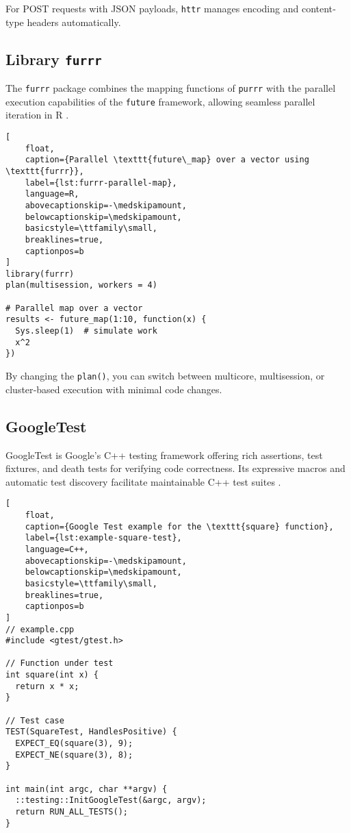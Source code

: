 For POST requests with JSON payloads, \texttt{httr} manages encoding and content‐type headers automatically.

\subsection{Library \texttt{furrr}}

The \texttt{furrr} package combines the mapping functions of \texttt{purrr} with the parallel execution capabilities of the \texttt{future} framework, allowing seamless parallel iteration in R \cite{Vaughan2020furrr}.

\begin{lstlisting}[
    float,
    caption={Parallel \texttt{future\_map} over a vector using \texttt{furrr}},
    label={lst:furrr-parallel-map},
    language=R,
    abovecaptionskip=-\medskipamount,
    belowcaptionskip=\medskipamount,
    basicstyle=\ttfamily\small,
    breaklines=true,
    captionpos=b
]
library(furrr)
plan(multisession, workers = 4)

# Parallel map over a vector
results <- future_map(1:10, function(x) {
  Sys.sleep(1)  # simulate work
  x^2
})
\end{lstlisting}


By changing the \texttt{plan()}, you can switch between multicore, multisession, or cluster‐based execution with minimal code changes.

\subsection{GoogleTest}

GoogleTest is Google’s C++ testing framework offering rich assertions, test fixtures, and death tests for verifying code correctness. Its expressive macros and automatic test discovery facilitate maintainable C++ test suites \cite{google2023gtest}.

\begin{lstlisting}[
    float,
    caption={Google Test example for the \texttt{square} function},
    label={lst:example-square-test},
    language=C++,
    abovecaptionskip=-\medskipamount,
    belowcaptionskip=\medskipamount,
    basicstyle=\ttfamily\small,
    breaklines=true,
    captionpos=b
]
// example.cpp
#include <gtest/gtest.h>

// Function under test
int square(int x) {
  return x * x;
}

// Test case
TEST(SquareTest, HandlesPositive) {
  EXPECT_EQ(square(3), 9);
  EXPECT_NE(square(3), 8);
}

int main(int argc, char **argv) {
  ::testing::InitGoogleTest(&argc, argv);
  return RUN_ALL_TESTS();
}
\end{lstlisting}


